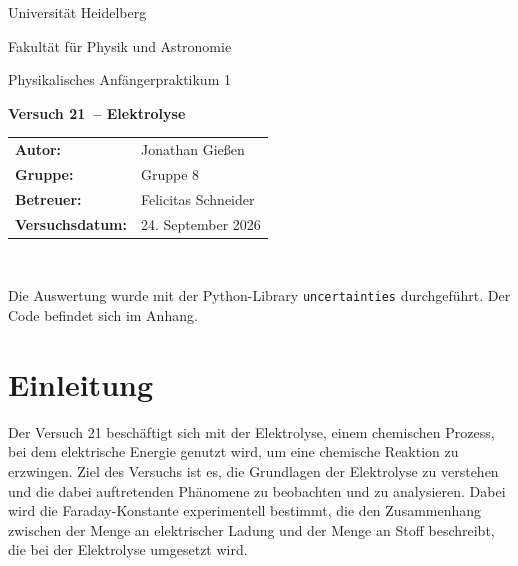 \documentclass[12pt,a4paper,titlepage]{scrartcl}
\numberwithin{equation}{section}
\numberwithin{table}{section}
\numberwithin{figure}{section}
\newcommand{\versuch}{Versuch 21}
\newcommand{\titel}{Elektrolyse}
\newcommand{\praktikum}{Physikalisches Anfängerpraktikum 1}
\newcommand{\autor}{Jonathan Gießen}
\newcommand{\gruppe}{Gruppe 8}
\newcommand{\datum}{24. September 2026}
\newcommand{\betreuer}{Felicitas Schneider}
\begin{document}
\pagestyle{scrheadings}


\begin{titlepage}



    \centering
    \vspace*{4cm}
    {\large Universität Heidelberg\par}
    {\small Fakultät für Physik und Astronomie\par}
    {\Large \praktikum\par}
    \vspace{0.8cm}
    {\LARGE \bfseries \versuch\ -- \titel\par}
    \vspace{1.5cm}

    
\begin{tabular}{ll}
        \textbf{Autor:} & \autor\\
        \textbf{Gruppe:} & \gruppe\\
        \textbf{Betreuer:} & \betreuer\\
        \textbf{Versuchsdatum:} & \datum\\
    \end{tabular}

    \vfill
    \hrulefill\
\end{titlepage}

\tableofcontents

\bigskip

\begin{tcolorbox}[title=Hinweis, colback=black!4!white, colframe=black!65!black, boxrule=0.8pt, arc=0.0mm, fonttitle=\bfseries]
    Die Auswertung wurde mit der Python-Library \texttt{uncertainties} durchgeführt. Der Code befindet sich im Anhang.
\end{tcolorbox}

\clearpage


\section{Einleitung}\label{sec:Einleitung}
Der Versuch 21 beschäftigt sich mit der Elektrolyse, einem chemischen Prozess, bei dem elektrische Energie genutzt wird, um eine chemische Reaktion zu erzwingen. Ziel des Versuchs ist es, die Grundlagen der Elektrolyse zu verstehen und die dabei auftretenden Phänomene zu beobachten und zu analysieren. Dabei wird die Faraday-Konstante experimentell bestimmt, die den Zusammenhang zwischen der Menge an elektrischer Ladung und der Menge an Stoff beschreibt, die bei der Elektrolyse umgesetzt wird.
\end{document}
